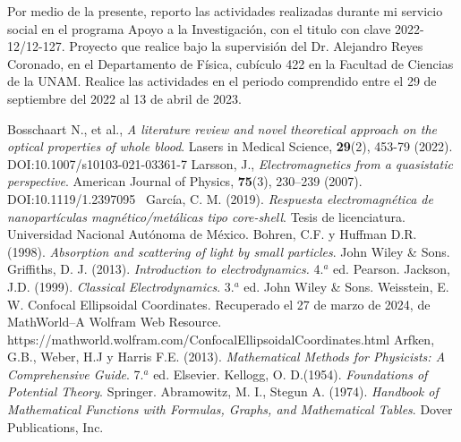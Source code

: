 \documentclass[8.5pt,letterpaper]{article}
\begin{document}
	Por medio de la presente, reporto las actividades realizadas durante mi servicio social en el programa Apoyo a la Investigación, con el titulo  con clave 2022-12/12-127. Proyecto que realice bajo la supervisión del Dr. Alejandro Reyes Coronado, en el Departamento de Física, cubículo 422 en la Facultad de Ciencias de la UNAM. Realice las actividades en el periodo comprendido entre el 29 de septiembre del 2022 al 13
	de abril de 2023.



\begin{thebibliography}{99}
	 Bosschaart N., et al., \textit{A literature review and novel theoretical approach on the optical properties of whole blood}. Lasers in Medical Science, \textbf{29}(2), 453-79 (2022). DOI:10.1007/s10103-021-03361-7
	 Larsson, J., \textit{Electromagnetics from a quasistatic perspective}. American Journal of Physics, \textbf{75}(3), 230–239 (2007). DOI:10.1119/1.2397095 
	 García, C. M. (2019). \textit{Respuesta electromagnética de nanopartículas magnético/metálicas tipo core-shell}. Tesis de licenciatura. Universidad Nacional Autónoma de México.
	Bohren, C.F. y  Huffman D.R.  (1998). \textit{Absorption and scattering of light by small particles}. John Wiley \& Sons.
	Griffiths, D. J.  (2013). \textit{Introduction to electrodynamics.} 4.$^a$ ed. Pearson.
	Jackson, J.D.  (1999). \textit{Classical Electrodynamics}. 3.$^a$ ed.  John Wiley \& Sons.
	 Weisstein, E. W. Confocal Ellipsoidal Coordinates. Recuperado el 27 de marzo de 2024, de MathWorld--A Wolfram Web Resource. https://mathworld.wolfram.com/ConfocalEllipsoidalCoordinates.html
	 Arfken, G.B., Weber, H.J y Harris F.E. (2013). \textit{Mathematical Methods for Physicists: A Comprehensive Guide}. 7.$^a$ ed. Elsevier.
	 Kellogg, O. D.(1954). \textit{Foundations of Potential Theory}. Springer.
	 Abramowitz, M. I., Stegun A. (1974). \textit{Handbook of Mathematical Functions with Formulas, Graphs, and
		Mathematical Tables}. Dover Publications, Inc.
\end{thebibliography}

	
\end{document}
